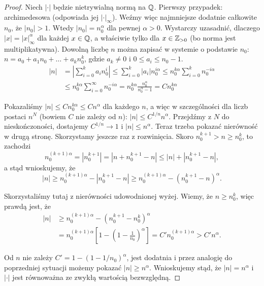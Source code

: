 \begin{proof}
	Niech $|\cdot|$ będzie nietrywialną normą na $\mathbb{Q}$.
	Pierwszy przypadek: archimedesowa (odpowiada jej $|\cdot|_\infty$).
	Weźmy więc najmniejsze dodatnie całkowite $n_0$, że $|n_0| > 1$.
	Wtedy $|n_0| = n_0^\alpha$ dla pewnej $\alpha > 0$.
	Wystarczy uzasadnić, dlaczego $|x| = |x|_\infty^\alpha$ dla każdej $x \in \mathbb{Q}$, a właściwie tylko dla $x \in \mathbb{Z}_{>0}$ (bo norma jest multiplikatywna).
	Dowolną liczbę $n$ można zapisać w systemie o podstawie $n_0$: $n = a_0 + a_1 n_0 + \dots + a_kn_0^k$, gdzie $a_k \neq 0$ i $0 \le a_i \le n_0-1$.
	\begin{align*}
	|n| & = \left|\sum_{i=0}^k a_in_0^i\right| \le \sum_{i=0}^k \left|a_i\right| n_0^{i \alpha} \le n_0^{k \alpha} \sum_{i = 0}^k n_0^{-i \alpha} \\ & \le n_0^{k \alpha} \sum_{i = 0}^\infty n_0^{-i \alpha} = n_0^{k \alpha} \frac{n_0^\alpha}{n_0^\alpha - 1} = C n_0^{k \alpha}
	\end{align*}

	Pokazaliśmy $|n| \le Cn_0^{k \alpha} \le C n^\alpha$ dla każdego $n$, a więc w szczególności dla liczb postaci $n^N$ (bowiem $C$ nie zależy od $n$): $|n| \le C^{1/n}n^\alpha$.
	Przejdźmy z $N$ do nieskończoności, dostajemy $C^{1/n} \to 1$ i $|n| \le n^\alpha$.
	Teraz trzeba pokazać nierówność w drugą stronę.
	Skorzystamy jeszcze raz z rozwinięcia.
	Skoro $n_0^{k+1} > n \ge n_0^k$, to zachodzi
	\[
		n_0^{(k+1)\alpha} = |n_0^{k+1}| = |n+n_0^{k+1} - n| \le |n| + |n_0^{k+1} - n|,
	\]
	a stąd wnioskujemy, że 
	\[
		|n| \ge n_0^{(k+1)\alpha} - |n_0^{k+1}-n| \ge n_0^{(k+1)\alpha} - (n_0^{k+1}-n)^\alpha.
	\]

	Skorzystaliśmy tutaj z nierówności udowodnionej wyżej.
	Wiemy, że $n \ge n_0^k$, więc prawdą jest, że
	\begin{align*}
		|n| & \ge n_0^{(k+1)\alpha} - (n_0^{k+1} - n_0^k)^\alpha \\
		& = n_0^{(k+1) \alpha} [1 - (1 - \textstyle \frac{1}{n_0})^\alpha]  = C' n_0^{(k+1)\alpha} > C' n^\alpha.
	\end{align*}

	Od $n$ nie zależy $C' = 1 - (1-1/n_0)^\alpha$, jest dodatnia i przez analogię do poprzedniej sytuacji możemy pokazać $|n| \ge n^\alpha$.
	Wnioskujemy stąd, że $|n| = n^\alpha$ i $|\cdot|$ jest równoważna ze zwykłą wartością bezwzględną.


\end{proof}
